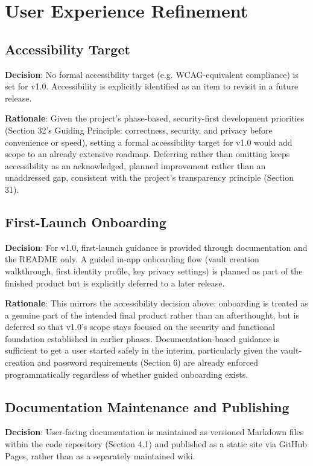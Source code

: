 \chapter{User Experience Refinement}

\section{Accessibility Target}
\textbf{Decision}: No formal accessibility target (e.g. WCAG-equivalent compliance) is set for v1.0. Accessibility is explicitly identified as an item to revisit in a future release.

\textbf{Rationale}: Given the project's phase-based, security-first development priorities (Section 32's Guiding Principle: correctness, security, and privacy before convenience or speed), setting a formal accessibility target for v1.0 would add scope to an already extensive roadmap. Deferring rather than omitting keeps accessibility as an acknowledged, planned improvement rather than an unaddressed gap, consistent with the project's transparency principle (Section 31).
\section{First-Launch Onboarding}
\textbf{Decision}: For v1.0, first-launch guidance is provided through documentation and the README only. A guided in-app onboarding flow (vault creation walkthrough, first identity profile, key privacy settings) is planned as part of the finished product but is explicitly deferred to a later release.

\textbf{Rationale}: This mirrors the accessibility decision above: onboarding is treated as a genuine part of the intended final product rather than an afterthought, but is deferred so that v1.0's scope stays focused on the security and functional foundation established in earlier phases. Documentation-based guidance is sufficient to get a user started safely in the interim, particularly given the vault-creation and password requirements (Section 6) are already enforced programmatically regardless of whether guided onboarding exists.
\section{Documentation Maintenance and Publishing}
\textbf{Decision}: User-facing documentation is maintained as versioned Markdown files within the code repository (Section 4.1) and published as a static site via GitHub Pages, rather than as a separately maintained wiki.

